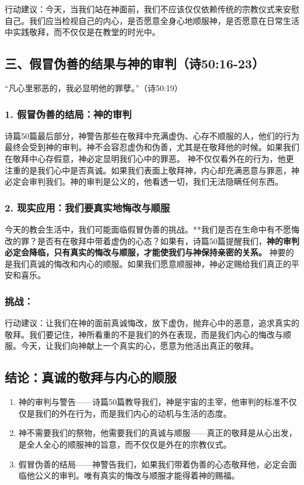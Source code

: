 \documentclass[a4paper, 12pt]{article}
\begin{document}
行动建议：今天，当我们站在神面前，我们不应该仅仅依赖传统的宗教仪式来安慰自己。我们应当检视自己的内心，是否愿意全身心地顺服神，是否愿意在日常生活中实践敬拜，而不仅仅是在教堂的时光中。
\subsection*{三、假冒伪善的结果与神的审判（诗50:16-23）}
“凡心里邪恶的，我必显明他的罪孽。”（诗50:19）

\subsubsection*{1. 假冒伪善的结局：神的审判}
诗篇50篇最后部分，神警告那些在敬拜中充满虚伪、心存不顺服的人，他们的行为最终会受到神的审判。神不会容忍虚伪和伪善，尤其是在敬拜他的时候。如果我们在敬拜中心存假意，神必定显明我们心中的罪恶。
神不仅仅看外在的行为，他更注重的是我们心中是否真诚。如果我们表面上敬拜神，内心却充满恶意与罪恶，神必定会审判我们。神的审判是公义的，他看透一切，我们无法隐瞒任何东西。
\subsubsection*{2. 现实应用：我们要真实地悔改与顺服}
今天的教会生活中，我们可能面临假冒伪善的挑战。**我们是否在生命中有不愿悔改的罪？是否有在敬拜中带着虚伪的心态？如果有，诗篇50篇提醒我们，\textbf{神的审判必定会降临，只有真实的悔改与顺服，才能使我们与神保持亲密的关系。}
神要的是我们真诚的悔改和内心的顺服。如果我们愿意顺服神，神必定赐给我们真正的平安和喜乐。
\subsubsection*{挑战：}

行动建议：让我们在神的面前真诚悔改，放下虚伪，抛弃心中的恶意，追求真实的敬拜。我们要记住，神所看重的不是我们的外在表现，而是我们内心的悔改与顺服。今天，让我们向神献上一个真实的心，愿意为他活出真正的敬拜。
\subsection*{结论：真诚的敬拜与内心的顺服}
\begin{enumerate}
    \item 神的审判与警告——诗篇50篇教导我们，神是宇宙的主宰，他审判的标准不仅仅是我们的外在行为，而是我们内心的动机与生活的态度。

    \item 神不需要我们的祭物，他需要我们的真诚与顺服——真正的敬拜是从心出发，是全人全心的顺服神的旨意，而不仅仅是外在的宗教仪式。

    \item 假冒伪善的结局——神警告我们，如果我们带着伪善的心态敬拜他，必定会面临他公义的审判。唯有真实的悔改与顺服才能得着神的赐福。

\end{enumerate}
\end{document}
